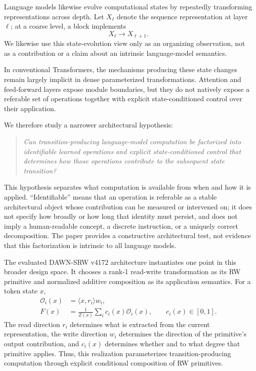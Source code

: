 \documentclass{article}
\newcommand{\DAWN}{DAWN-SRW}
\newcommand{\op}{\mathcal{O}}
\begin{document}
Language models likewise evolve computational states by repeatedly transforming
representations across depth. Let \(X_\ell\) denote the sequence representation
at layer \(\ell\); at a coarse level, a block implements
\[
X_\ell\longrightarrow X_{\ell+1}.
\]
We likewise use this state-evolution view only as an organizing observation,
not as a contribution or a claim about an intrinsic language-model semantics.

In conventional Transformers, the mechanisms producing these state changes
remain largely implicit in dense parameterized transformations. Attention and
feed-forward layers expose module boundaries, but they do not natively expose a
referable set of operations together with explicit state-conditioned control
over their application.

We therefore study a narrower architectural hypothesis:
\begin{quote}
\emph{Can transition-producing language-model computation be factorized into
identifiable learned operations and explicit state-conditioned control that
determines how those operations contribute to the subsequent state transition?}
\end{quote}
This hypothesis separates what computation is available from when and how it is
applied. ``Identifiable'' means that an operation is referable as a stable
architectural object whose contribution can be measured or intervened on; it
does not specify how broadly or how long that identity must persist, and does
not imply a human-readable concept, a discrete instruction, or a uniquely
correct decomposition. The paper provides a constructive architectural test,
not evidence that this factorization is intrinsic to all language models.

The evaluated \DAWN{} v4172 architecture instantiates one point in this broader
design space. It chooses a rank-1 read-write transformation as its RW primitive
and normalized additive composition as its application semantics. For a token
state \(x\),
\begin{align}
\op_i(x)&=\langle x,r_i\rangle w_i,
\label{eq:intro_operator}\\
F(x)&=\frac{1}{Z(x)}\sum_i c_i(x)\op_i(x),
\qquad c_i(x)\in[0,1].
\label{eq:intro_field}
\end{align}
The read direction \(r_i\) determines what is extracted from the current
representation, the write direction \(w_i\) determines the direction of the
primitive's output contribution, and \(c_i(x)\) determines whether and to what
degree that primitive applies. Thus, this realization parameterizes
transition-producing computation through explicit conditional composition of RW
primitives.
\end{document}
